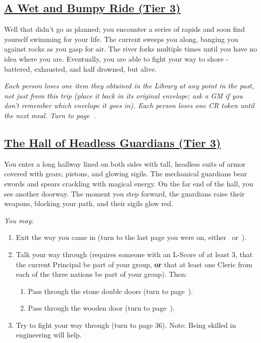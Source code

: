 \documentclass[sheet]{GL2020}
\begin{document}
\begin{center}\section*{\underline{A Wet and Bumpy Ride (Tier 3)}}\end{center}
\label{WetandBumpyRide}

Well that didn’t go as planned; you encounter a series of rapids and soon find yourself swimming for your life. The current sweeps you along, banging you against rocks as you gasp for air. The river forks multiple times until you have no idea where you are. Eventually, you are able to fight your way to shore - battered, exhausted, and half drowned, but alive.

\vspace{0.5cm}

\begingroup
\itshape
Each person loses one item they obtained in the Library at any point in the past, not just from this trip (place it back in its original envelope; ask a GM if you don't remember which envelope it goes in). Each person loses one CR token until the next meal. Turn to page~\pageref{UpsideDownGrotto}.
\endgroup

\clearpage

\begin{center}\section*{\underline{The Hall of Headless Guardians (Tier 3)}}\end{center}
\label{HallofHeadlessGuardians}

You enter a long hallway lined on both sides with tall, headless suits of armor covered with gears, pistons, and glowing sigils. The mechanical guardians bear swords and spears crackling with magical energy. On the far end of the hall, you see another doorway. The moment you step forward, the guardians raise their weapons, blocking your path, and their sigils glow red.

\vspace{0.5cm}

\begingroup
\itshape
You may:
\begin{enumerate}[A]
  \item Exit the way you came in (turn to the last page you were on, either~\pageref{DeeperStacks} or~\pageref{ChamberofRelics}).
	\item Talk your way through (requires someone with an L-Score of at least 3, that the current Principal be part of your group, \textbf{or} that at least one Cleric from each of the three nations be part of your group). Then:
	\begin{enumerate}
		\item Pass through the stone double doors (turn to page~\pageref{ChamberofRelics}).
		\item Pass through the wooden door (turn to page~\pageref{DeeperStacks}).
	\end{enumerate}
	\item Try to fight your way through (turn to page 36). Note: Being skilled in engineering will help.
\end{enumerate}
\endgroup
\end{document}
